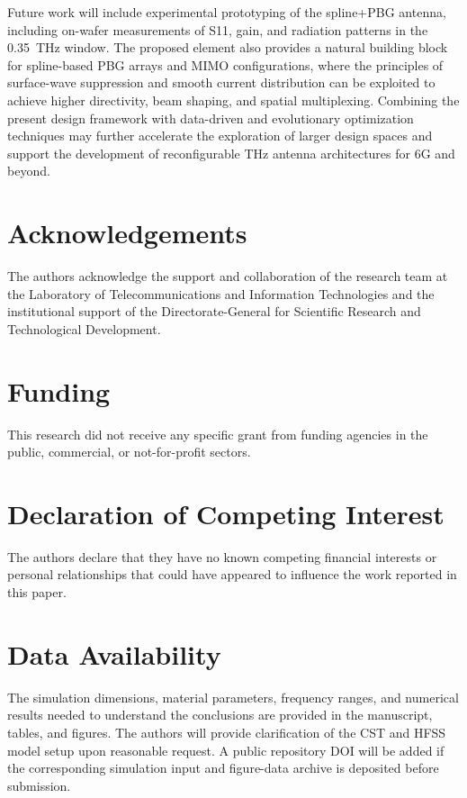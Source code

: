 \documentclass[a4paper,fleqn]{cas-dc}
\begin{document}
Future work will include experimental prototyping of the spline+PBG antenna, including on-wafer measurements of S11, gain, and radiation patterns in the 0.35~THz window. The proposed element also provides a natural building block for spline-based PBG arrays and MIMO configurations, where the principles of surface-wave suppression and smooth current distribution can be exploited to achieve higher directivity, beam shaping, and spatial multiplexing. Combining the present design framework with data-driven and evolutionary optimization techniques may further accelerate the exploration of larger design spaces and support the development of reconfigurable THz antenna architectures for 6G and beyond.

\section*{Acknowledgements}
The authors acknowledge the support and collaboration of the research team at the Laboratory of Telecommunications and Information Technologies and the institutional support of the Directorate-General for Scientific Research and Technological Development.

\section*{Funding}
This research did not receive any specific grant from funding agencies in the public, commercial, or not-for-profit sectors.

\section*{Declaration of Competing Interest}
The authors declare that they have no known competing financial interests or personal relationships that could have appeared to influence the work reported in this paper.

\section*{Data Availability}
The simulation dimensions, material parameters, frequency ranges, and numerical results needed to understand the conclusions are provided in the manuscript, tables, and figures. The authors will provide clarification of the CST and HFSS model setup upon reasonable request. A public repository DOI will be added if the corresponding simulation input and figure-data archive is deposited before submission.
\end{document}
